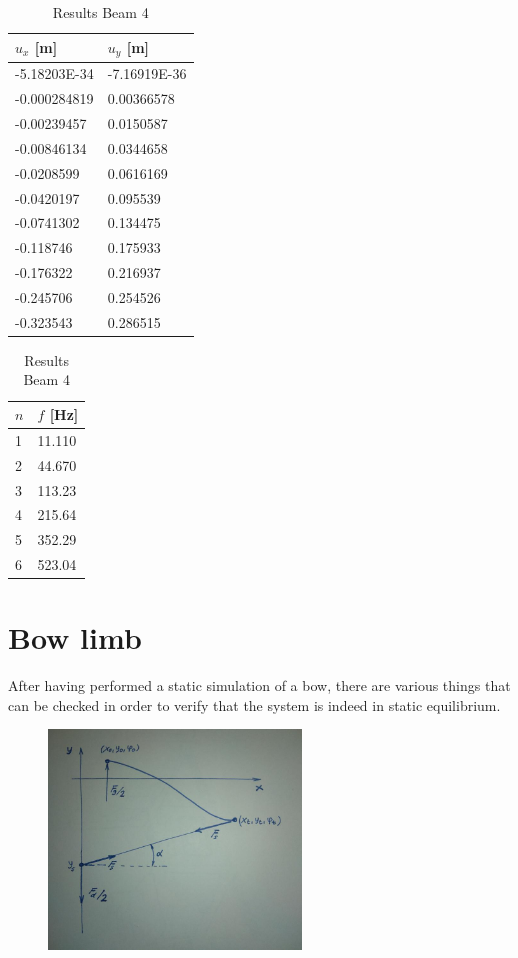 \begin{table}[H]
\begin{tabular}{ll}
\hline
$u_x$ [m] & $u_y$ [m] \\
\hline
-5.18203E-34 & -7.16919E-36 \\
-0.000284819 & 0.00366578 \\
-0.00239457 & 0.0150587 \\
-0.00846134 & 0.0344658 \\
-0.0208599 & 0.0616169 \\
-0.0420197 & 0.095539 \\
-0.0741302 & 0.134475 \\
-0.118746 & 0.175933 \\
-0.176322 & 0.216937 \\
-0.245706 & 0.254526 \\
-0.323543 & 0.286515 \\
\hline
\end{tabular}
\begin{tabular}{ll}
\hline
$n$ & $f$ [Hz] \\
\hline
1 & 11.110 \\
2 & 44.670 \\
3 & 113.23 \\
4 & 215.64 \\
5 & 352.29 \\
6 & 523.04 \\
\hline
\end{tabular}
\caption{Results Beam 4}
\end{table}

\newpage
\section{Bow limb}

After having performed a static simulation of a bow, there are various things that can be checked in order to verify that the system is indeed in static equilibrium.

\begin{figure}[H]
\centering
\includegraphics[width=0.6\textwidth]{figures/verification/bow-static-forces}
\label{fig:verification:bow-static-forces}
\end{figure}

